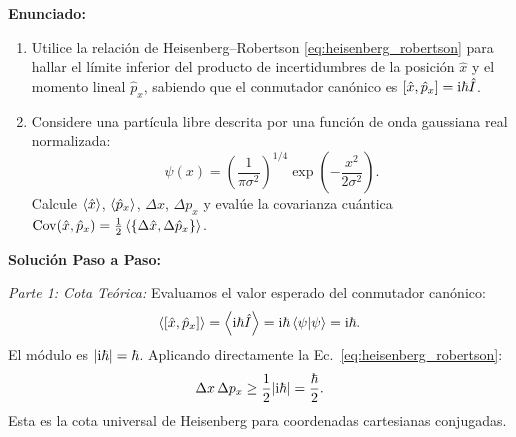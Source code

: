\begin{ejemplobox}
    \textbf{Enunciado:}
    \begin{enumerate}
        \item Utilice la relación de Heisenberg--Robertson \eqref{eq:heisenberg_robertson} para hallar el límite inferior del producto de incertidumbres de la posición $\hat{x}$ y el momento lineal $\hat{p}_x$, sabiendo que el conmutador canónico es $[\hat{x}, \hat{p}_x] = \mathrm{i}\hbar\hat{I}$.
        \item Considere una partícula libre descrita por una función de onda gaussiana real normalizada:
        \begin{equation}
            \psi(x) = \left(\frac{1}{\pi \sigma^2}\right)^{1/4} \exp\left(-\frac{x^2}{2\sigma^2}\right).
        \end{equation}
        Calcule $\left\langle \hat{x} \right\rangle$, $\left\langle \hat{p}_x \right\rangle$, $\Delta x$, $\Delta p_x$ y evalúe la covarianza cuántica $\mathrm{Cov}(\hat{x}, \hat{p}_x) = \frac{1}{2}\left\langle \{\Delta\hat{x}, \Delta\hat{p}_x\} \right\rangle$.
    \end{enumerate}

    \textbf{Solución Paso a Paso:}

    \textit{Parte 1: Cota Teórica:}
    Evaluamos el valor esperado del conmutador canónico:
    \begin{equation}
        \left\langle [\hat{x}, \hat{p}_x] \right\rangle = \left\langle \mathrm{i}\hbar\hat{I} \right\rangle = \mathrm{i}\hbar\left\langle \psi \middle| \psi \right\rangle = \mathrm{i}\hbar.
    \end{equation}
    El módulo es $|\mathrm{i}\hbar| = \hbar$. Aplicando directamente la Ec.~\eqref{eq:heisenberg_robertson}:
    \begin{equation}
        \Delta x \, \Delta p_x \ge \frac{1}{2}|\mathrm{i}\hbar| = \frac{\hbar}{2}.
    \end{equation}
    Esta es la cota universal de Heisenberg para coordenadas cartesianas conjugadas.


\end{ejemplobox}
